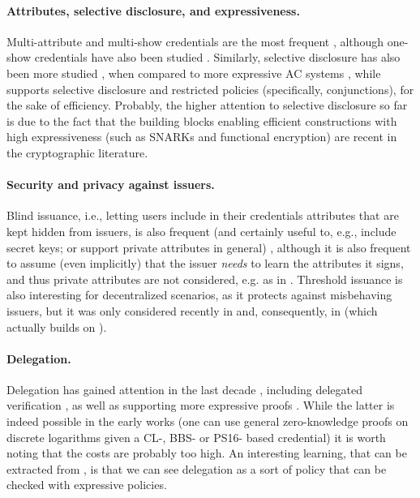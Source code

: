 \paragraph{Attributes, selective disclosure, and expressiveness.} %
Multi-attribute and multi-show credentials are the most frequent
\cite{cks10,cl11,cdhk15,ckl+15,fhs19,sms+19,halp20,hs21}, although one-show
credentials have also been studied \cite{bran00}.
Similarly, selective disclosure has also been more studied
\cite{cks10,cl11,cdhk15,sms+19,halp20,hs21}, when compared to 
more expressive AC systems \cite{bcc+09,cklm14,dmm+18}, while \cite{fhs19}
supports selective disclosure and restricted policies (specifically,
conjunctions), for the sake of efficiency. Probably, the higher attention to
selective disclosure so far is due to the fact that the building blocks enabling
efficient constructions with high expressiveness (such as SNARKs and functional
encryption) are recent in the cryptographic literature.

\paragraph{Security and privacy against issuers.} %
Blind issuance, i.e., letting users include in their credentials attributes that
are kept hidden from issuers, is also frequent (and certainly useful to, e.g.,
include secret keys; or support private attributes in general)
\cite{cklm14,ckl+15}, although it is also frequent to assume (even implicitly)
that the issuer \emph{needs} to learn the attributes it signs, and thus private
attributes are not considered, e.g. as in \cite{dmm+18,fhs19,sms+19}.
%
Threshold issuance is also interesting for decentralized scenarios, as it
protects against misbehaving issuers, but it was only considered recently in
\cite{sms+19} and, consequently, in \cite{halp20} (which actually builds on
\cite{sms+19}).

\paragraph{Delegation.} %
Delegation has gained attention in the last decade \cite{bcc+09,cklm14},
including delegated verification \cite{dmm+18}, as well as supporting more
expressive proofs \cite{cklm14,dmm+18}. While the latter is indeed possible in
the early works (one can use general zero-knowledge proofs on discrete
logarithms given a CL-, BBS- or PS16- based credential) it is worth noting that
the costs are probably too high. An interesting learning, that can be extracted
from \cite{cklm14}, is that we can see delegation as a sort of policy that can
be checked with expressive policies.

